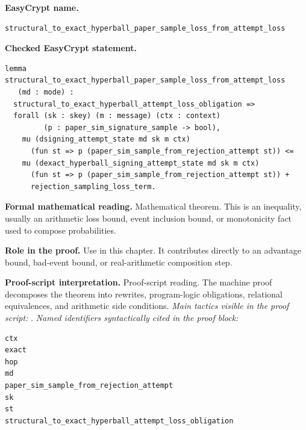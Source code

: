 \begin{formaltheorem}
\noindent\textbf{EasyCrypt name.}
\begin{lstlisting}[language=EasyCrypt,basicstyle=\ttfamily\scriptsize]
structural_to_exact_hyperball_paper_sample_loss_from_attempt_loss
\end{lstlisting}
\noindent\textbf{Checked EasyCrypt statement.}
\begin{lstlisting}[language=EasyCrypt,basicstyle=\ttfamily\scriptsize]
lemma structural_to_exact_hyperball_paper_sample_loss_from_attempt_loss
   (md : mode) :
  structural_to_exact_hyperball_attempt_loss_obligation =>
  forall (sk : skey) (m : message) (ctx : context)
         (p : paper_sim_signature_sample -> bool),
    mu (dsigning_attempt_state md sk m ctx)
      (fun st => p (paper_sim_sample_from_rejection_attempt st)) <=
    mu (dexact_hyperball_signing_attempt_state md sk m ctx)
      (fun st => p (paper_sim_sample_from_rejection_attempt st)) +
      rejection_sampling_loss_term.
\end{lstlisting}
\noindent\textbf{Formal mathematical reading.}
Mathematical theorem. This is an inequality, usually an arithmetic loss bound, event inclusion bound, or monotonicity fact used to compose probabilities.

\noindent\textbf{Role in the proof.}
Use in this chapter. It contributes directly to an advantage bound, bad-event bound, or real-arithmetic composition step.

\noindent\textbf{Proof-script interpretation.}
Proof-script reading. The machine proof decomposes the theorem into rewrites, program-logic obligations, relational equivalences, and arithmetic side conditions.
\emph{Main tactics visible in the proof script:} .
\emph{Named identifiers syntactically cited in the proof block:}
\begin{lstlisting}[language=EasyCrypt,basicstyle=\ttfamily\scriptsize]
ctx
exact
hop
md
paper_sim_sample_from_rejection_attempt
sk
st
structural_to_exact_hyperball_attempt_loss_obligation
\end{lstlisting}

\end{formaltheorem}

